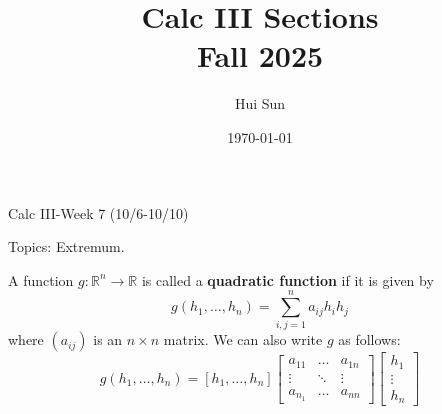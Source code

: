 \documentclass[openany]{book}
\title{Calc III Sections
\\ 
\vspace{0.4cm}
\large Fall 2025}
\date{\today}
\author{Hui Sun}
\newcommand{\R}{\mathbb{R}}
\begin{document}
\maketitle

\newpage


\begin{center}
    \Large Calc III-Week 7 (10/6-10/10)
\end{center}

\renewcommand\thesection{\arabic{section}}

\noindent
Topics: Extremum. 





\begin{defn}
    A function $g:\R^n\to\R$ is called a \textbf{quadratic function} if it is given by 
    \begin{equation*}
        g(h_1,\dots, h_n)=\sum_{i,j=1}^na_{ij}h_ih_j
    \end{equation*}
    where $(a_{ij})$ is an $n\times n$ matrix. We can also write $g$ as follows:
    \begin{equation*}
        g(h_1,\dots,h_n)=[h_1,\dots,h_n]\begin{bmatrix}
            a_{11}&\dots &a_{1n}\\
            \vdots&\ddots &\vdots\\
            a_{n_1}&\dots&a_{nn}
        \end{bmatrix}\begin{bmatrix}
            h_1\\
            \vdots\\
            h_n
        \end{bmatrix}
    \end{equation*}

\end{defn}
\end{document}

